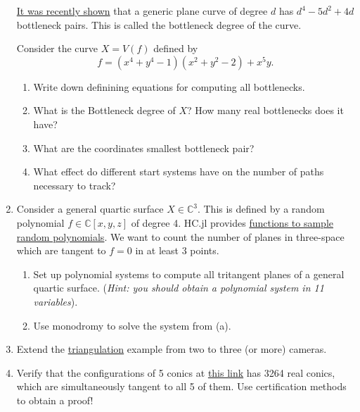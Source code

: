\documentclass[11pt,reqno]{amsart}
\theoremstyle{definition}
\theoremstyle{remark}
\numberwithin{equation}{section}
\begin{document}
\begin{enumerate}
\href{https://arxiv.org/abs/1904.04502}{It was recently shown} that a generic plane curve of degree $d$ has $d^4-5d^2 +4d$ bottleneck pairs. This is called the {bottleneck degree} of the curve.


Consider the curve $X=V(f)$ defined by
$$f=(x^4 + y^4 - 1)(x^2 + y^2 - 2) + x^5y.$$
\begin{enumerate}
\item Write down definining equations for computing all bottlenecks.

\item What is the Bottleneck degree of $X$? How many real bottlenecks does it have?

\item What are the coordinates smallest bottleneck pair?

\item What effect do different start systems have on the number of paths necessary to track?
\end{enumerate}

\item Consider a general quartic surface $X\in\mathbb C^3$.  This is defined by a random polynomial $f\in \mathbb{C}[x,y,z]$ of degree 4. HC.jl provides  \href{https://www.juliahomotopycontinuation.org/HomotopyContinuation.jl/stable/model_kit/}{functions to sample random polynomials}. We want to count the number of planes in three-space which are tangent to $f=0$ in at least 3 points.
\begin{enumerate}
\item Set up polynomial systems to compute all tritangent planes of a general quartic surface. (\textit{Hint: you should obtain a polynomial system in 11 variables}).
\item Use monodromy to solve the system from (a).
\end{enumerate}

\item Extend the \href{https://www.juliahomotopycontinuation.org/examples/computer-vision/}{triangulation} example from two to three (or more) cameras.

\item Verify that the configurations of 5 conics at \href{https://www.juliahomotopycontinuation.org/examples/3264/}{this link} has 3264 real conics, which are simultaneously tangent to all 5 of them. Use certification methods to obtain a proof!
\end{enumerate}
\end{document}
